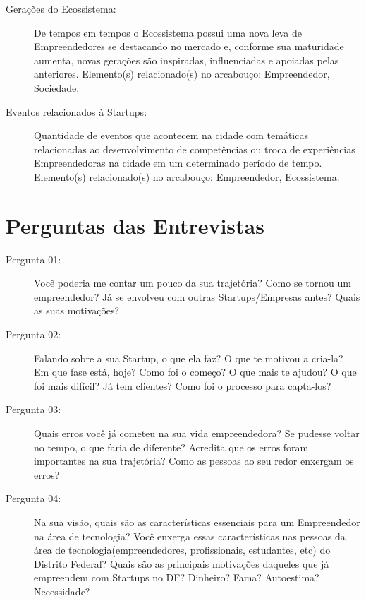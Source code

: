\begin{apendicesenv}
\begin{description}
  \item [Gerações do Ecossistema:] De tempos em tempos o Ecossistema possui uma nova leva de Empreendedores se destacando no mercado e, conforme sua maturidade aumenta, novas gerações são inspiradas, influenciadas e apoiadas pelas anteriores. Elemento(s) relacionado(s) no arcabouço: Empreendedor, Sociedade.  

  \item [Eventos relacionados à Startups:] Quantidade de eventos que acontecem na cidade com temáticas relacionadas ao desenvolvimento de competências ou troca de experiências Empreendedoras na cidade em um determinado período de tempo. Elemento(s) relacionado(s) no arcabouço: Empreendedor, Ecossistema.     
\end{description}

\chapter{Perguntas das Entrevistas}
\label{apendices:perguntas_das_entrevistas}

\begin{description}


  \item [Pergunta 01:] Você poderia me contar um pouco da sua trajetória? Como se tornou um empreendedor? Já se envolveu com outras Startups/Empresas antes? Quais as suas motivações? 

  \item [Pergunta 02:] Falando sobre a sua Startup, o que ela faz? O que te motivou a cria-la? Em que fase está, hoje? Como foi o começo? O que mais te ajudou? O que foi mais difícil? Já tem clientes? Como foi o processo para capta-los?


  \item [Pergunta 03:] Quais erros você já cometeu na sua vida empreendedora? Se pudesse voltar no tempo, o que faria de diferente? Acredita que os erros foram importantes na sua trajetória? Como as pessoas ao seu redor enxergam os erros? 

  \item [Pergunta 04:] Na sua visão, quais são as características essenciais para um Empreendedor na área de tecnologia? Você enxerga essas características nas pessoas da área de tecnologia(empreendedores, profissionais, estudantes, etc) do Distrito Federal? Quais são as principais motivações daqueles que já empreendem com Startups no DF? Dinheiro? Fama? Autoestima? Necessidade?
  

\end{description}
\end{apendicesenv}
